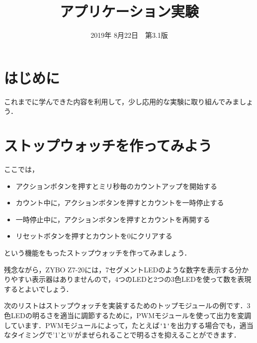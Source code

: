 \documentclass[a4paper,dvipdfmx]{jsarticle}
\begin{document}
\title{アプリケーション実験}
\author{}
\date{2019年 8月22日~~第3.1版}
\maketitle

\section{はじめに}
これまでに学んできた内容を利用して，少し応用的な実験に取り組んでみましょう．

\section{ストップウォッチを作ってみよう}
ここでは，
\begin{itemize}
 \item アクションボタンを押すとミリ秒毎のカウントアップを開始する
 \item カウント中に，アクションボタンを押すとカウントを一時停止する
 \item 一時停止中に，アクションボタンを押すとカウントを再開する
 \item リセットボタンを押すとカウントを0にクリアする
\end{itemize}
という機能をもったストップウォッチを作ってみましょう．

残念ながら，ZYBO Z7-20には，7セグメントLEDのような数字を表示する分かりやすい表示器はありませんので，4つのLEDと2つの3色LEDを使って数を表現するとよいでしょう．

次のリストはストップウォッチを実装するためのトップモジュールの例です．3色LEDの明るさを適当に調節するために，PWMモジュールを使って出力を変調しています．PWMモジュールによって，たとえば\verb|'1'|を出力する場合でも，適当なタイミングで'1'と'0'がまぜられることで明るさを抑えることができます．
\end{document}
